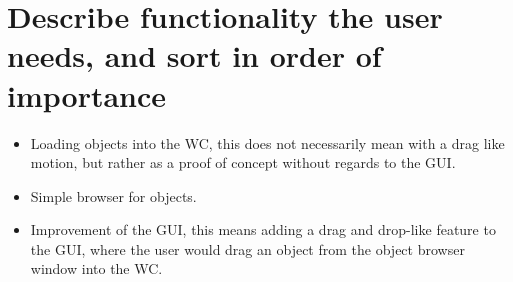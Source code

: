 \section{Describe functionality the user needs, and sort in order of importance}

\begin{itemize}

\item Loading objects into the WC, this does not necessarily mean with a drag like motion, but rather as a proof of concept without regards to the GUI.

\item Simple browser for objects.

\item Improvement of the GUI, this means adding a drag and drop-like feature to the GUI, where the user would drag an object from the object browser window into the WC.

\end{itemize}